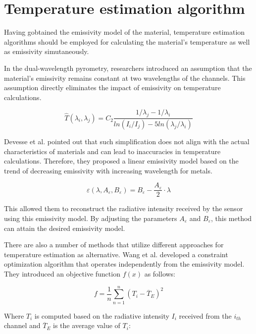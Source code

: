\section{Temperature estimation algorithm}
Having gobtained the emissivity model of the material, temperature estimation 
algorithms should be employed for calculating the material's 
temperature as well as emissivity simutaneously.


In the dual-wavelength pyrometry, researchers introduced an assumption 
that the material's emissivity remains constant at two 
wavelengths of the channels. This assumption directly eliminates the 
impact of emissivity on temperature calculations\cite{Grujic.2023}.

\begin{equation}
    \widehat{T}(\lambda_i, \lambda_j)=C_2 \frac{1/\lambda_j - 1/\lambda_i}{ln(I_i/I_j) - 5ln(\lambda_j / \lambda_i)}
\end{equation}

Devesse et al. pointed out that such simplification does not align 
with the actual characteristics of materials and can lead to inaccuracies 
in temperature calculations\cite{Devesse.2017}. Therefore, they proposed 
a linear emissivity model based on the trend of decreasing emissivity with 
increasing wavelength for metals. 

\begin{equation}
    \varepsilon(\lambda, A_{\varepsilon}, B_{\varepsilon}) = B_{\varepsilon} - \frac{A_{\varepsilon}}{2} \cdot \lambda
\end{equation}

This allowed them to reconstruct the 
radiative intensity received by the sensor using this emissivity model.
By adjusting the parameters $A_{\varepsilon}$ and $B_{\varepsilon}$, this 
method can attain the desired emissivity model.


There are also a number of methods that utilize different approaches for temperature
estimation as alternative.
Wang et al. developed a constraint optimization algorithm that 
operates independently from the emissivity model\cite{Wang.2021b}. They 
introduced an objective function $f(x)$ as follows:

\begin{equation}
    \label{eq: fun_wang_2021b}
    f=\frac{1}{n}\sum_{n = 1}^{n}\left(T_i - \overline{T}_E \right)^2  
\end{equation}

Where $T_i$ is computed based on the radiative intensity $I_i$ received from 
the $i_{th}$ channel and $\overline{T}_E$ is the average value of $T_i$:

